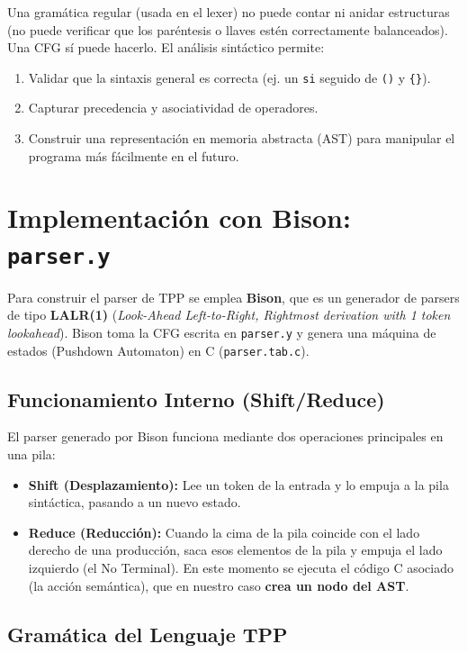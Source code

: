\begin{infobox}
Una gramática regular (usada en el lexer) no puede contar ni anidar estructuras (no puede verificar que los paréntesis o llaves estén correctamente balanceados). Una CFG sí puede hacerlo. El análisis sintáctico permite:
\begin{enumerate}
    \item Validar que la sintaxis general es correcta (ej. un \texttt{si} seguido de \texttt{()} y \texttt{\{\}}).
    \item Capturar precedencia y asociatividad de operadores.
    \item Construir una representación en memoria abstracta (AST) para manipular el programa más fácilmente en el futuro.
\end{enumerate}
\end{infobox}

\section{Implementación con Bison: \texttt{parser.y}}

Para construir el parser de TPP se emplea \textbf{Bison}, que es un generador de parsers de tipo \textbf{LALR(1)} (\textit{Look-Ahead Left-to-Right, Rightmost derivation with 1 token lookahead}). Bison toma la CFG escrita en \texttt{parser.y} y genera una máquina de estados (Pushdown Automaton) en C (\texttt{parser.tab.c}).

\subsection{Funcionamiento Interno (Shift/Reduce)}

El parser generado por Bison funciona mediante dos operaciones principales en una pila:
\begin{itemize}
    \item \textbf{Shift (Desplazamiento):} Lee un token de la entrada y lo empuja a la pila sintáctica, pasando a un nuevo estado.
    \item \textbf{Reduce (Reducción):} Cuando la cima de la pila coincide con el lado derecho de una producción, saca esos elementos de la pila y empuja el lado izquierdo (el No Terminal). En este momento se ejecuta el código C asociado (la acción semántica), que en nuestro caso \textbf{crea un nodo del AST}.
\end{itemize}

\subsection{Gramática del Lenguaje TPP}

